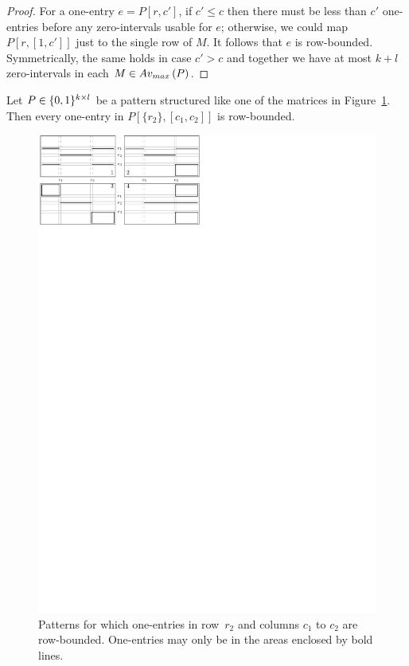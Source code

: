 \begin{proof}
For a one-entry $e=P[r,c']$, if $c'\leq c$ then there must be less than $c'$ one-entries before any zero-intervals usable for $e$; otherwise, we could map $P[r,[1,c']]$ just to the single row of $M$. It follows that $e$ is row-bounded. Symmetrically, the same holds in case $c'>c$ and together we have at most $k+l$ zero-intervals in each $M\in Av_{max}\left(P\right)$.
\end{proof}

\begin{lemma}
\label{lemma:H}
Let $P\in\{0,1\}^{k\times l}$ be a pattern structured like one of the matrices in Figure~\ref{fig:lemmaH}. Then every one-entry in $P[\{r_2\},[c_1,c_2]]$ is row-bounded.

\begin{figure}[!ht]
\centering
\includegraphics[width=\textwidth]{img/lemmaH.pdf}
\caption{Patterns for which one-entries in row~$r_2$ and columns $c_1$ to $c_2$ are row-bounded. One-entries may only be in the areas enclosed by bold lines.}
\label{fig:lemmaH}
\end{figure}
\end{lemma}

